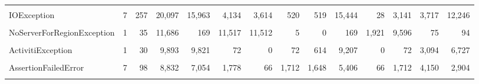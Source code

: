 \begin{table*}[t]
\begin{tabular}{l|rrr|rr|rrrr|rrrr}
\cellcolor{gray!6}{NullPointerException}&\cellcolor{gray!6}{22}&\cellcolor{gray!6}{498}&\cellcolor{gray!6}{49,906}&\cellcolor{gray!6}{41,709}&\cellcolor{gray!6}{8,197}&\cellcolor{gray!6}{1,644}&\cellcolor{gray!6}{6,553}&\cellcolor{gray!6}{449}&\cellcolor{gray!6}{41,260}&\cellcolor{gray!6}{34}&\cellcolor{gray!6}{8,163}&\cellcolor{gray!6}{7,913}&\cellcolor{gray!6}{33,796}\\
IOException&7&257&20,097&15,963&4,134&3,614&520&519&15,444&28&3,141&3,717&12,246\\
\cellcolor{gray!6}{RuntimeException}&\cellcolor{gray!6}{17}&\cellcolor{gray!6}{420}&\cellcolor{gray!6}{13,810}&\cellcolor{gray!6}{13,676}&\cellcolor{gray!6}{134}&\cellcolor{gray!6}{43}&\cellcolor{gray!6}{91}&\cellcolor{gray!6}{1,011}&\cellcolor{gray!6}{12,665}&\cellcolor{gray!6}{31}&\cellcolor{gray!6}{103}&\cellcolor{gray!6}{1,141}&\cellcolor{gray!6}{12,535}\\
NoServerForRegionException&1&35&11,686&169&11,517&11,512&5&0&169&1,921&9,596&75&94\\
\cellcolor{gray!6}{UnknownHostException}&\cellcolor{gray!6}{9}&\cellcolor{gray!6}{234}&\cellcolor{gray!6}{9,942}&\cellcolor{gray!6}{319}&\cellcolor{gray!6}{9,623}&\cellcolor{gray!6}{9,620}&\cellcolor{gray!6}{3}&\cellcolor{gray!6}{0}&\cellcolor{gray!6}{319}&\cellcolor{gray!6}{9,620}&\cellcolor{gray!6}{3}&\cellcolor{gray!6}{0}&\cellcolor{gray!6}{319}\\
ActivitiException&1&30&9,893&9,821&72&0&72&614&9,207&0&72&3,094&6,727\\
\cellcolor{gray!6}{IllegalArgumentException}&\cellcolor{gray!6}{17}&\cellcolor{gray!6}{401}&\cellcolor{gray!6}{9,052}&\cellcolor{gray!6}{9,049}&\cellcolor{gray!6}{3}&\cellcolor{gray!6}{0}&\cellcolor{gray!6}{3}&\cellcolor{gray!6}{190}&\cellcolor{gray!6}{8,859}&\cellcolor{gray!6}{0}&\cellcolor{gray!6}{3}&\cellcolor{gray!6}{212}&\cellcolor{gray!6}{8,837}\\
AssertionFailedError&7&98&8,832&7,054&1,778&66&1,712&1,648&5,406&66&1,712&4,150&2,904\\
\cellcolor{gray!6}{PersistenceException}&\cellcolor{gray!6}{2}&\cellcolor{gray!6}{30}&\cellcolor{gray!6}{8,581}&\cellcolor{gray!6}{8,580}&\cellcolor{gray!6}{1}&\cellcolor{gray!6}{0}&\cellcolor{gray!6}{1}&\cellcolor{gray!6}{164}&\cellcolor{gray!6}{8,416}&\cellcolor{gray!6}{0}&\cellcolor{gray!6}{1}&\cellcolor{gray!6}{398}&\cellcolor{gray!6}{8,182}\\





\end{tabular}
\end{table*}
